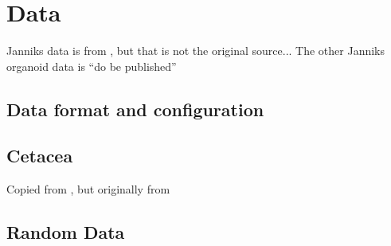 \section{Data}\label{sec:data}
Janniks data is from \cite{kappesComparativeStudyModern2015a}, but that is not the original source...
The other Janniks organoid data is “do be published”
\subsection{Data format and configuration}\label{subsec:data_format}
\subsection{Cetacea}\label{subsec:cetacea}
Copied from \cite{grotschelCuttingPlaneAlgorithm1989}, but originally from 
\subsection{Random Data}\label{subsec:random_data}
